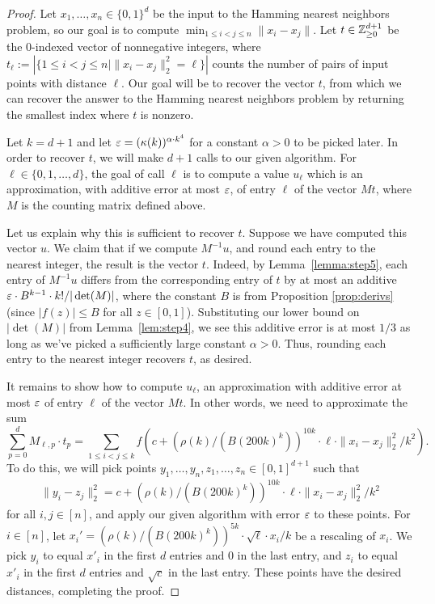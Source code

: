 \begin{proof}
Let $x_1, \ldots, x_n \in \{0,1\}^d$ be the input to the Hamming nearest neighbors problem, so our goal is to compute $\min_{1 \leq i < j \leq n} \|x_i - x_j\|$. Let $t \in {\mathbb Z}_{\geq 0}^{d+1}$ be the 0-indexed vector of nonnegative integers, where $t_\ell := | \{ 1 \leq i < j \leq n \mid \|x_i - x_j\|_2^2 = \ell \} |$ counts the number of pairs of input points with distance $\ell$. Our goal will be to recover the vector $t$, from which we can recover the answer to the Hamming nearest neighbors problem by returning the smallest index where $t$ is nonzero.

Let $k=d+1$ and let $\varepsilon = (\kappa(k))^{\alpha \cdot k^4}$ for a constant $\alpha>0$ to be picked later. In order to recover $t$, we will make $d+1$ calls to our given algorithm. For $\ell \in \{0,1,\ldots,d\}$, the goal of call $\ell$ is to compute a value $u_\ell$ which is an approximation, with additive error at most $\varepsilon$, of entry $\ell$ of the vector $M t$, where $M$ is the counting matrix defined above.

Let us explain why this is sufficient to recover $t$. Suppose we have computed this vector $u$. We claim that if we compute $M^{-1}u$, and round each entry to the nearest integer, the result is the vector $t$. Indeed, by Lemma~\ref{lemma:step5}, each entry of $M^{-1}u$ differs from the corresponding entry of $t$ by at most an additive $\varepsilon \cdot B^{k-1} \cdot k! / |\det(M)|$, where the constant $B$ is from Proposition \ref{prop:derivs} (since $|f(z)|\le B$ for all $z\in [0,1]$). Substituting our lower bound on $|\det(M)|$ from Lemma~\ref{lem:step4}, we see this additive error is at most $1/3$ as long as we've picked a sufficiently large constant $\alpha>0$. Thus, rounding each entry to the nearest integer recovers $t$, as desired.

It remains to show how to compute $u_\ell$, an approximation with additive error at most $\varepsilon$ of entry $\ell$ of the vector $M t$. In other words, we need to approximate the sum $$\sum_{p=0}^d M_{\ell,p} \cdot t_p = \sum_{1 \leq i < j \leq k} f(c + (\rho(k)/(B(200k)^k))^{10k} \cdot \ell \cdot \|x_i - x_j\|_2^2 / k^2).$$ To do this, we will pick points $y_1, \ldots, y_n, z_1, \ldots, z_n \in [0,1]^{d+1}$ such that 
\begin{align*}
\|y_i - z_j\|_2^2 = c + (\rho(k)/(B(200k)^k))^{10k} \cdot \ell \cdot \|x_i - x_j\|_2^2 / k^2
\end{align*}
for all $i,j \in [n]$, and apply our given algorithm with error $\varepsilon$ to these points. For $i \in [n]$, let $x_i' = (\rho(k)/(B(200k)^k))^{5k} \cdot \sqrt{\ell} \cdot x_i / k$ be a rescaling of $x_i$. We pick $y_i$ to equal $x'_i$ in the first $d$ entries and $0$ in the last entry, and $z_i$  to equal $x'_i$ in the first $d$ entries and $\sqrt{c}$ in the last entry. These points have the desired distances, completing the proof.
\end{proof}

